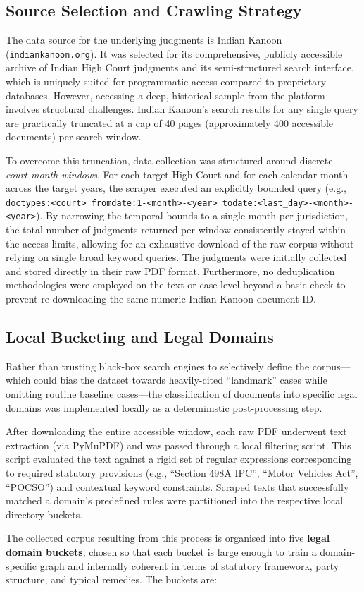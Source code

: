 {\color{blue}
\subsection{Source Selection and Crawling Strategy}

The data source for the underlying judgments is Indian Kanoon (\texttt{indiankanoon.org}). It was selected for its comprehensive, publicly accessible archive of Indian High Court judgments and its semi-structured search interface, which is uniquely suited for programmatic access compared to proprietary databases. However, accessing a deep, historical sample from the platform involves structural challenges. Indian Kanoon's search results for any single query are practically truncated at a cap of 40 pages (approximately 400 accessible documents) per search window. 

To overcome this truncation, data collection was structured around discrete \emph{court-month windows}. For each target High Court and for each calendar month across the target years, the scraper executed an explicitly bounded query (e.g., \texttt{doctypes:<court> fromdate:1-<month>-<year> todate:<last\_day>-<month>-<year>}). By narrowing the temporal bounds to a single month per jurisdiction, the total number of judgments returned per window consistently stayed within the access limits, allowing for an exhaustive download of the raw corpus without relying on single broad keyword queries. The judgments were initially collected and stored directly in their raw PDF format. Furthermore, no deduplication methodologies were employed on the text or case level beyond a basic check to prevent re-downloading the same numeric Indian Kanoon document ID. 

\subsection{Local Bucketing and Legal Domains}

Rather than trusting black-box search engines to selectively define the corpus---which could bias the dataset towards heavily-cited ``landmark'' cases while omitting routine baseline cases---the classification of documents into specific legal domains was implemented locally as a deterministic post-processing step.

After downloading the entire accessible window, each raw PDF underwent text extraction (via PyMuPDF) and was passed through a local filtering script. This script evaluated the text against a rigid set of regular expressions corresponding to required statutory provisions (e.g., ``Section 498A IPC'', ``Motor Vehicles Act'', ``POCSO'') and contextual keyword constraints. Scraped texts that successfully matched a domain's predefined rules were partitioned into the respective local directory buckets.

The collected corpus resulting from this process is organised into five \textbf{legal domain buckets}, chosen so that each bucket is large enough to train a domain-specific graph and internally coherent in terms of statutory framework, party structure, and typical remedies. The buckets are:
}

